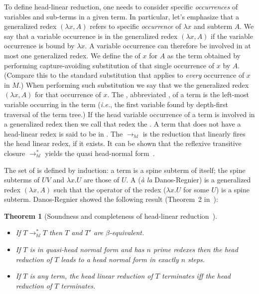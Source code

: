\documentclass{elsarticle}
\makeatletter
\theoremstyle{plain}
\newtheorem{theorem}{Theorem}[section]
\theoremstyle{definition}
\renewcommand\ie{{\it i.e.\@\xspace}}
\newcommand{\hlred}{\rightarrow_{hl}}
\makeatother
\begin{document}
To define head-linear reduction, one needs to consider specific \emph{occurrences} of variables and sub-terms in a given term. In particular, let's emphasize that a generalized redex  $(\lambda x, A)$ refers to specific \emph{occurrence} of $\lambda x$ and subterm $A$.
%
We say that a variable occurrence is  in the generalized redex $(\lambda x, A)$ if the variable occurrence is bound by $\lambda x$. A variable occurrence can therefore be involved in at most one generalized redex. We define the  of $x$ for $A$ as the term obtained by performing capture-avoiding substitution of that single occurrence of $x$ by $A$. (Compare this to the standard substitution that applies to \emph{every} occurrence of $x$ in $M$.) When performing such substitution we say that we  the generalized redex $(\lambda x, A)$ for that occurrence of $x$.
%
The , abbreviated , of a term is the left-most variable occurring in the term (\ie, the first variable found by depth-first traversal of the term tree.) If the head variable occurrence of a term is involved in a generalized redex then we call that redex the .
A term that does not have a head-linear redex is said to be in .
The  $\hlred$ is the reduction that linearly fires the head linear redex, if it exists. It can be shown that the reflexive transitive closure $\rightarrow^*_{hl}$ yields the quasi head-normal form~\cite{danos-head,danosherbelinregnier1996}.

The set of  is defined by induction: a term is a spine subterm of itself; the spine subterms of $U V$ and $\lambda x. U$ are those of $U$.
A  ({\it \`a la} Danos-Regnier) is a generalized redex $(\lambda x, A)$ such that the operator of the redex ($\lambda x . U$ for some $U$) is a spine subterm. Danos-Regnier showed the following result (Theorem~2 in~\cite{danos-head}):
\begin{theorem}[Soundness and completeness of head-linear reduction~\cite{danos-head}] \
\label{thm:danosregnier_headlinred}
\begin{itemize}[nosep]
\item If $T \rightarrow^*_{hl} T$  then $T$ and $T'$ are $\beta$-equivalent.
\item If $T$ is in quasi-head normal form and has $n$ prime redexes then the head reduction of $T$ leads to a head normal form in exactly $n$ steps.
\item If $T$ is any term, the head linear reduction of $T$ terminates iff the head reduction of $T$ terminates.
\end{itemize}
\end{theorem}
\end{document}
